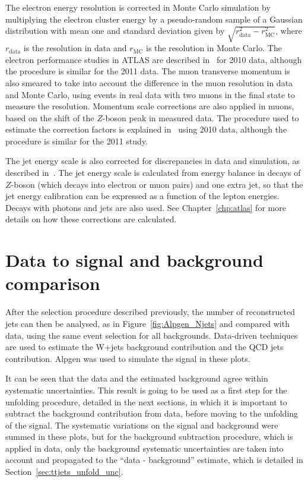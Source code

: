 The
electron energy resolution is corrected in Monte Carlo simulation by multiplying the electron cluster energy by a pseudo-random
sample of a Gaussian distribution with mean one and standard deviation given by $\sqrt{r_{\textrm{data}}^2 - r_{\textrm{MC}}^2}$, where $r_{\textrm{data}}$ is
the resolution in data and $r_{\textrm{MC}}$ is the resolution in Monte Carlo. The electron performance studies in ATLAS are described in~\cite{electron2010} for 2010
data, although the procedure is similar for the 2011 data.
The muon transverse momentum is also smeared to take into account the difference in the muon resolution
in data and Monte Carlo, using events in real data
with two muons in the final state to measure the resolution. Momentum scale corrections are also applied in muons, based on the shift of the $Z$-boson peak in measured
data. The procedure used to estimate the correction factors is explained in~\cite{muonres2010} using 2010 data, although the procedure is similar for the 2011 study.

The jet energy scale is also corrected for discrepancies in data and simulation, as described in~\cite{jes2011}. The jet energy scale is calculated from energy balance
in decays of $Z$-boson (which decays into electron or muon pairs) and one extra jet, so that the jet energy calibration can be expressed as a function of the lepton energies.
Decays with photons and jets are also used. See Chapter~\ref{chp:atlas} for more details on how these corrections are calculated.

\section{Data to signal and background comparison}

After the selection procedure described previously, the number of reconstructed jets can then be analysed,
as in Figure~\ref{fig:Alpgen_Njets}
and compared with
data, using the same event selection for all backgrounds.
Data-driven techniques are used to estimate the W+jets background
contribution and the QCD jets contribution.
Alpgen was used to simulate the \ttbar signal in these plots.

It can be seen that the data and the estimated background agree within systematic uncertainties. This result
is going to be used as a first step for the unfolding procedure, detailed in the next sections, in which
it is important to subtract the background contribution from data, before moving to the unfolding of the
\ttbar  signal. The systematic variations on the signal and background were summed in these plots, but for the
background subtraction procedure, which is applied in data, only the background systematic uncertainties are taken into
account and propagated to the ``data - background'' estimate, which is detailed in Section~\ref{sec:ttjets_unfold_unc}.

